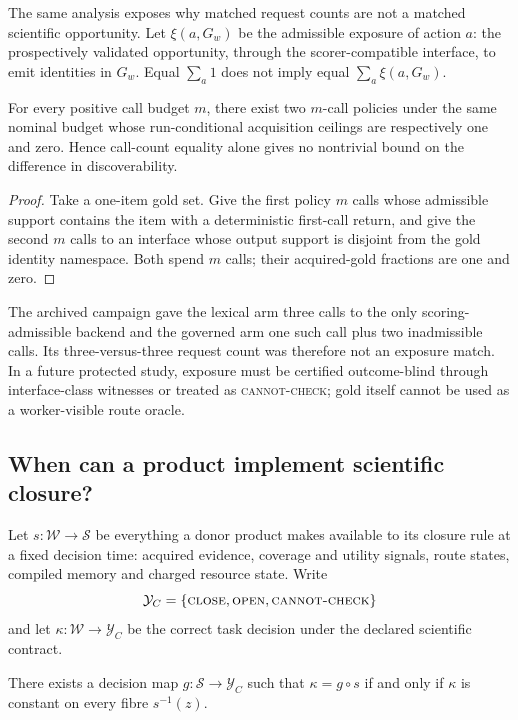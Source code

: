 The same analysis exposes why matched request counts are not a matched
scientific opportunity.  Let $\xi(a,G_w)$ be the admissible exposure of action
$a$: the prospectively validated opportunity, through the scorer-compatible
interface, to emit identities in $G_w$.  Equal $\sum_a 1$ does not imply equal
$\sum_a\xi(a,G_w)$.

\begin{proposition}
\label{prop:call-exposure}
For every positive call budget $m$, there exist two $m$-call policies under the
same nominal budget whose run-conditional acquisition ceilings are respectively
one and zero.  Hence call-count equality alone gives no nontrivial bound on the
difference in discoverability.
\end{proposition}

\begin{proof}
Take a one-item gold set.  Give the first policy $m$ calls whose admissible
support contains the item with a deterministic first-call return, and give the
second $m$ calls to an interface whose output support is disjoint from the gold
identity namespace.  Both spend $m$ calls; their acquired-gold fractions are one
and zero.
\end{proof}

The archived campaign gave the lexical arm three calls to
the only scoring-admissible backend and the governed arm one such call plus two
inadmissible calls.  Its three-versus-three request count was therefore not an
exposure match.  In a future protected study, exposure must be certified
outcome-blind through interface-class witnesses or treated as
\textsc{cannot-check}; gold itself cannot be used as a worker-visible route
oracle.

\subsection{When can a product implement scientific closure?}

Let $s:\mathcal W\rightarrow\mathcal S$ be everything a donor product makes
available to its closure rule at a fixed decision time: acquired evidence,
coverage and utility signals, route states, compiled memory and charged
resource state.  Write
\[
 \mathcal Y_C=\{\textsc{close},\textsc{open},\textsc{cannot-check}\}
\]
and let $\kappa:\mathcal W\rightarrow\mathcal Y_C$ be the correct task
decision under the declared scientific contract.

\begin{theorem}
\label{thm:factorization}
There exists a decision map $g:\mathcal S\rightarrow\mathcal Y_C$ such that
$\kappa=g\circ s$ if and only if $\kappa$ is constant on every fibre
$s^{-1}(z)$.
\end{theorem}


